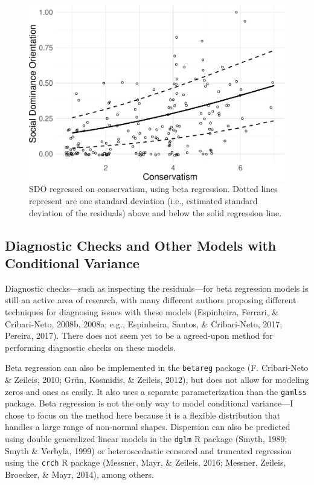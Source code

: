 \documentclass[english,man]{apa6}
\newcounter{author}
\theoremstyle{definition}
\theoremstyle{definition}
\theoremstyle{remark}
\begin{document}
\begin{figure}
\centering
\includegraphics{beta_hurdle_files/figure-latex/unnamed-chunk-19-1.pdf}
\caption{\label{fig:unnamed-chunk-19}SDO regressed on conservatism, using
beta regression. Dotted lines represent are one standard deviation
(i.e., estimated standard deviation of the residuals) above and below
the solid regression line.}
\end{figure}

\subsection{Diagnostic Checks and Other Models with Conditional
Variance}\label{diagnostic-checks-and-other-models-with-conditional-variance}

Diagnostic checks---such as inspecting the residuals---for beta
regression models is still an active area of research, with many
different authors proposing different techniques for diagnosing issues
with these models (Espinheira, Ferrari, \& Cribari-Neto, 2008b, 2008a;
e.g., Espinheira, Santos, \& Cribari-Neto, 2017; Pereira, 2017). There
does not seem yet to be a agreed-upon method for performing diagnostic
checks on these models.

Beta regression can also be implemented in the \texttt{betareg} package
(F. Cribari-Neto \& Zeileis, 2010; Grün, Kosmidis, \& Zeileis, 2012),
but does not allow for modeling zeros and ones as easily. It also uses a
separate parameterization than the \texttt{gamlss} package. Beta
regression is not the only way to model conditional variance---I chose
to focus on the method here because it is a flexible distribution that
handles a large range of non-normal shapes. Dispersion can also be
predicted using double generalized linear models in the \texttt{dglm} R
package (Smyth, 1989; Smyth \& Verbyla, 1999) or heteroscedastic
censored and truncated regression using the \texttt{crch} R package
(Messner, Mayr, \& Zeileis, 2016; Messner, Zeileis, Broecker, \& Mayr,
2014), among others.
\end{document}
